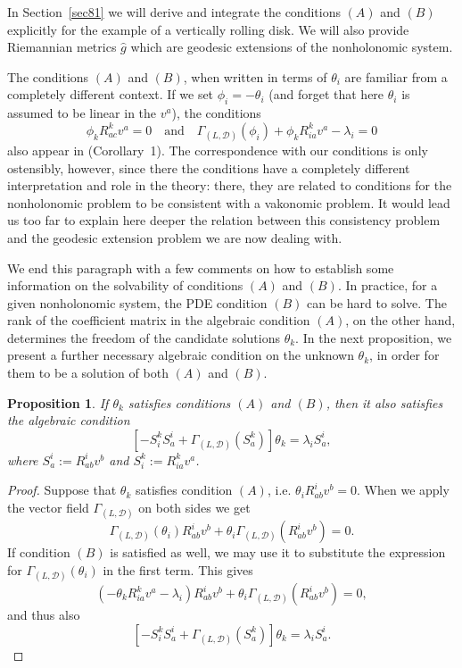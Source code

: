 \documentclass[11pt]{article}
\newtheorem{prop}{Proposition}
\def\GLD{{\Gamma_{(L,\mathcal{D})}}}
\begin{document}
In Section~\ref{sec81} we will derive and integrate the conditions $(A)$ and $(B)$ explicitly for the example of a vertically rolling disk. We will also provide Riemannian metrics $\hat g$ which are geodesic extensions of the nonholonomic system. 


The conditions $(A)$ and $(B)$, when written in terms of $\theta_i$ are familiar from a completely different context. If we set $\phi_i=-\theta_i$ (and forget that here $\theta_i$ is assumed to be linear in the $v^a$), the conditions
\[ 
\phi_k R^k_{ac} v^a =0 \quad\mbox{and}\quad \Gamma_{(L,\mathcal{D})}(\phi_i)+\phi_k R^k_{ia}v^a -\lambda_i=0
	\]
	also appear in \cite{anhol} (Corollary~1). The correspondence with our conditions  is only ostensibly, however, since there the conditions have a completely different interpretation and role in the theory: there, they are related to conditions for the nonholonomic problem to be consistent with a vakonomic problem. It would lead us too far  to explain here deeper the relation between this consistency problem and the geodesic extension problem we are now dealing with.\newline

 {We end this paragraph with a few comments on how to establish some information on the solvability of conditions $(A)$ and $(B)$. In practice, for a given nonholonomic system, the PDE condition $(B)$ can be hard to solve. The rank of the coefficient matrix in the algebraic condition $(A)$, on the other hand, determines the freedom of the candidate solutions $\theta_k$. In the next proposition, we  present a further necessary algebraic condition on the unknown $\theta_k$, in order for them to be a solution of both  $(A)$ and $(B)$.}

\begin{prop} \label{propsolv}
{If $\theta_k$ satisfies conditions $(A)$ and $(B)$, then it also satisfies  the  algebraic condition 
\[
\left[-S_i^k S^i_a+ \GLD(S^k_a)\right]\theta_k=\lambda_i S^i_a,
\]
where $S^i_a:=R^i_{ab}v^b$ and $S_i^k:=R_{ia}^k v^a$.}\end{prop}
\begin{proof}
{Suppose that  $\theta_k$ satisfies condition $(A)$, i.e. $\theta_i R^i_{ab}v^b=0$. When we apply the vector field $\GLD$ on both sides we get 
$$\GLD(\theta_i)R^i_{ab}v^b+\theta_i\GLD(R^i_{ab}v^b)=0. $$
If condition $(B)$ is satisfied as well, we may use  it to substitute the expression for $\GLD(\theta_i)$ in the first term. This gives 
$$\left(-\theta_k R^k_{ia}v^a-\lambda_i\right) R^i_{ab}v^b+\theta_i\GLD(R^i_{ab}v^b)=0, $$
and thus also $$\left[-S_i^k S^i_a+\GLD(S^k_a)\right]\theta_k=\lambda_i S^i_a.$$
}
\end{proof}
\end{document}
